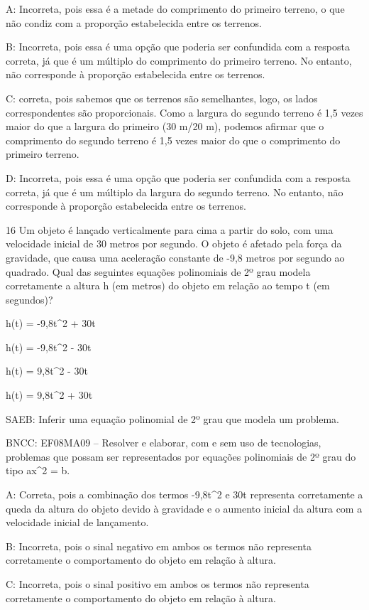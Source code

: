 {A: Incorreta, pois essa é a metade do comprimento do primeiro terreno, o
que não condiz com a proporção estabelecida entre os terrenos.

B: Incorreta, pois essa é uma opção que poderia ser confundida com a
resposta correta, já que é um múltiplo do comprimento do primeiro
terreno. No entanto, não corresponde à proporção estabelecida entre os
terrenos.

C: correta, pois sabemos que os terrenos são semelhantes, logo, os lados
correspondentes são proporcionais. Como a largura do segundo terreno é
1,5 vezes maior do que a largura do primeiro (30 m/20 m), podemos
afirmar que o comprimento do segundo terreno é 1,5 vezes maior do que o
comprimento do primeiro terreno.

D: Incorreta, pois essa é uma opção que poderia ser confundida com a
resposta correta, já que é um múltiplo da largura do segundo terreno. No
entanto, não corresponde à proporção estabelecida entre os terrenos.

\num{16} Um objeto é lançado verticalmente para cima a partir do solo, com
uma velocidade inicial de 30 metros por segundo. O objeto é afetado pela
força da gravidade, que causa uma aceleração constante de -9,8 metros
por segundo ao quadrado. Qual das seguintes equações polinomiais de 2º
grau modela corretamente a altura h (em metros) do objeto em relação ao
tempo t (em segundos)?
\item h(t) = -9,8t^2 + 30t
\item h(t) = -9,8t^2 - 30t
\item h(t) = 9,8t^2 - 30t
\item h(t) = 9,8t^2 + 30t

SAEB: Inferir uma equação polinomial de 2º grau que modela um problema.

BNCC: EF08MA09 -- Resolver e elaborar, com e sem uso de tecnologias,
problemas que possam ser representados por equações polinomiais de 2º
grau do tipo ax^2 = b.

A: Correta, pois a combinação dos termos -9,8t^2 e 30t representa
corretamente a queda da altura do objeto devido à gravidade e o aumento
inicial da altura com a velocidade inicial de lançamento.

B: Incorreta, pois o sinal negativo em ambos os termos não representa
corretamente o comportamento do objeto em relação à altura.

C: Incorreta, pois o sinal positivo em ambos os termos não representa
corretamente o comportamento do objeto em relação à altura.

}
